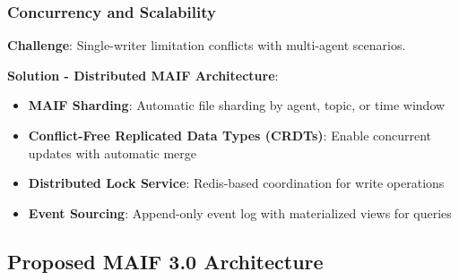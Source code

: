\documentclass[conference]{IEEEtran}
\begin{document}
\subsubsection{Concurrency and Scalability}

\textbf{Challenge}: Single-writer limitation conflicts with multi-agent scenarios.

\textbf{Solution - Distributed MAIF Architecture}:
\begin{itemize}[leftmargin=*]
\item \textbf{MAIF Sharding}: Automatic file sharding by agent, topic, or time window
\item \textbf{Conflict-Free Replicated Data Types (CRDTs)}: Enable concurrent updates with automatic merge
\item \textbf{Distributed Lock Service}: Redis-based coordination for write operations
\item \textbf{Event Sourcing}: Append-only event log with materialized views for queries
\end{itemize}

\subsection{Proposed MAIF 3.0 Architecture}
\end{document}

